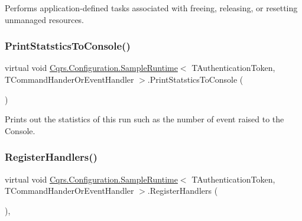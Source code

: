 Performs application-\/defined tasks associated with freeing, releasing, or resetting unmanaged resources. 

\mbox{\label{classCqrs_1_1Configuration_1_1SampleRuntime_a058cc1b64ffab9b1f2d0a4ca196a17ab_a058cc1b64ffab9b1f2d0a4ca196a17ab}} 
\subsubsection{\texorpdfstring{Print\+Statstics\+To\+Console()}{PrintStatsticsToConsole()}}
{\footnotesize\ttfamily virtual void \hyperlink{classCqrs_1_1Configuration_1_1SampleRuntime}{Cqrs.\+Configuration.\+Sample\+Runtime}$<$ T\+Authentication\+Token, T\+Command\+Hander\+Or\+Event\+Handler $>$.Print\+Statstics\+To\+Console (\begin{DoxyParamCaption}{ }\end{DoxyParamCaption})\hspace{0.3cm}{\ttfamily [virtual]}}



Prints out the statistics of this run such as the number of event raised to the Console. 

\mbox{\label{classCqrs_1_1Configuration_1_1SampleRuntime_a001d4810823f11dee9144834182f8e05_a001d4810823f11dee9144834182f8e05}} 
\subsubsection{\texorpdfstring{Register\+Handlers()}{RegisterHandlers()}}
{\footnotesize\ttfamily virtual void \hyperlink{classCqrs_1_1Configuration_1_1SampleRuntime}{Cqrs.\+Configuration.\+Sample\+Runtime}$<$ T\+Authentication\+Token, T\+Command\+Hander\+Or\+Event\+Handler $>$.Register\+Handlers (\begin{DoxyParamCaption}{ }\end{DoxyParamCaption})\hspace{0.3cm}{\ttfamily [protected]}, {\ttfamily [virtual]}}



